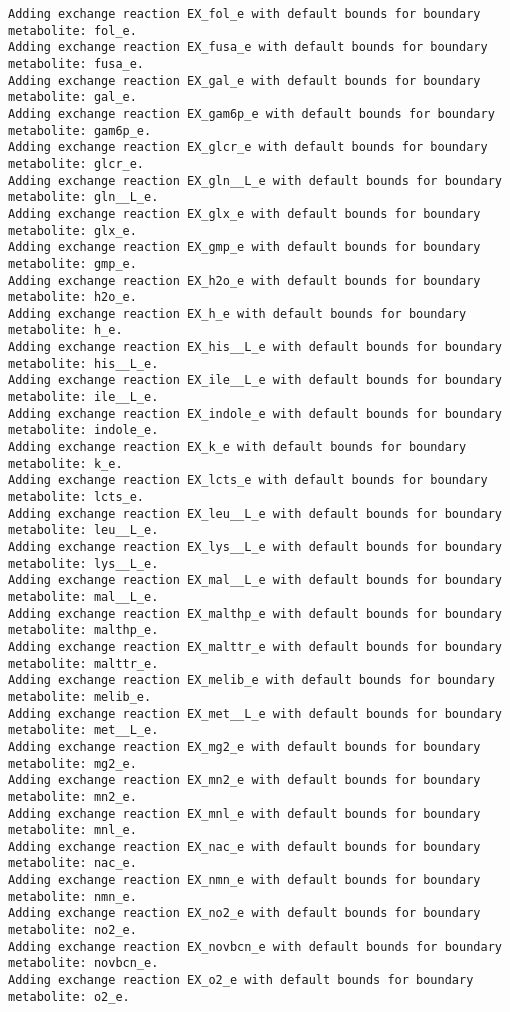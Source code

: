 \documentclass[
  letterpaper,
  DIV=11,
  numbers=noendperiod]{scrartcl}
\begin{document}
\begin{verbatim}
Adding exchange reaction EX_fol_e with default bounds for boundary metabolite: fol_e.
Adding exchange reaction EX_fusa_e with default bounds for boundary metabolite: fusa_e.
Adding exchange reaction EX_gal_e with default bounds for boundary metabolite: gal_e.
Adding exchange reaction EX_gam6p_e with default bounds for boundary metabolite: gam6p_e.
Adding exchange reaction EX_glcr_e with default bounds for boundary metabolite: glcr_e.
Adding exchange reaction EX_gln__L_e with default bounds for boundary metabolite: gln__L_e.
Adding exchange reaction EX_glx_e with default bounds for boundary metabolite: glx_e.
Adding exchange reaction EX_gmp_e with default bounds for boundary metabolite: gmp_e.
Adding exchange reaction EX_h2o_e with default bounds for boundary metabolite: h2o_e.
Adding exchange reaction EX_h_e with default bounds for boundary metabolite: h_e.
Adding exchange reaction EX_his__L_e with default bounds for boundary metabolite: his__L_e.
Adding exchange reaction EX_ile__L_e with default bounds for boundary metabolite: ile__L_e.
Adding exchange reaction EX_indole_e with default bounds for boundary metabolite: indole_e.
Adding exchange reaction EX_k_e with default bounds for boundary metabolite: k_e.
Adding exchange reaction EX_lcts_e with default bounds for boundary metabolite: lcts_e.
Adding exchange reaction EX_leu__L_e with default bounds for boundary metabolite: leu__L_e.
Adding exchange reaction EX_lys__L_e with default bounds for boundary metabolite: lys__L_e.
Adding exchange reaction EX_mal__L_e with default bounds for boundary metabolite: mal__L_e.
Adding exchange reaction EX_malthp_e with default bounds for boundary metabolite: malthp_e.
Adding exchange reaction EX_malttr_e with default bounds for boundary metabolite: malttr_e.
Adding exchange reaction EX_melib_e with default bounds for boundary metabolite: melib_e.
Adding exchange reaction EX_met__L_e with default bounds for boundary metabolite: met__L_e.
Adding exchange reaction EX_mg2_e with default bounds for boundary metabolite: mg2_e.
Adding exchange reaction EX_mn2_e with default bounds for boundary metabolite: mn2_e.
Adding exchange reaction EX_mnl_e with default bounds for boundary metabolite: mnl_e.
Adding exchange reaction EX_nac_e with default bounds for boundary metabolite: nac_e.
Adding exchange reaction EX_nmn_e with default bounds for boundary metabolite: nmn_e.
Adding exchange reaction EX_no2_e with default bounds for boundary metabolite: no2_e.
Adding exchange reaction EX_novbcn_e with default bounds for boundary metabolite: novbcn_e.
Adding exchange reaction EX_o2_e with default bounds for boundary metabolite: o2_e.

\end{verbatim}
\end{document}
